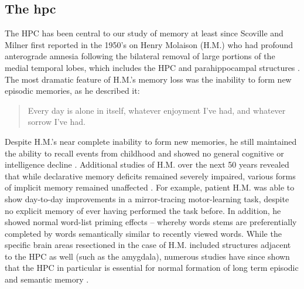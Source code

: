 \subsection{The \acl{hpc}}
\label{sec:intro:memory:hpc}
The \ac{HPC} has been central to our study of memory at least since Scoville and Milner first reported in the 1950's on Henry Molaison (H.M.) who had profound anterograde amnesia following the bilateral removal of large portions of the medial temporal lobes, which includes the \ac{HPC} and parahippocampal structures \citep{Scoville1957}.
The most dramatic feature of H.M.'s memory loss was the inability to form new episodic memories, as he described it:
\begin{quote}
Every day is alone in itself, whatever enjoyment I've had, and whatever sorrow I've had.
\end{quote}
Despite H.M.'s near complete inability to form new memories, he still maintained the ability to recall events from childhood and showed no general cognitive or intelligence decline \citep{Squire2009}.
Additional studies of H.M. over the next 50 years revealed that while declarative memory deficits remained severely impaired, various forms of implicit memory remained unaffected \citep{Corkin2002}.
For example, patient H.M. was able to show day-to-day improvements in a mirror-tracing motor-learning task, despite no explicit memory of ever having performed the task before.
In addition, he showed normal word-list priming effects -- whereby words stems are preferentially completed by words semantically similar to recently viewed words. 
While the specific brain areas resectioned in the case of H.M. included structures adjacent to the \ac{HPC} as well (such as the amygdala), numerous studies have since shown that the \ac{HPC} in particular is essential for normal formation of long term episodic and semantic memory \citep[reviewed in][]{Eichenbaum2000, Burgess2002}.

